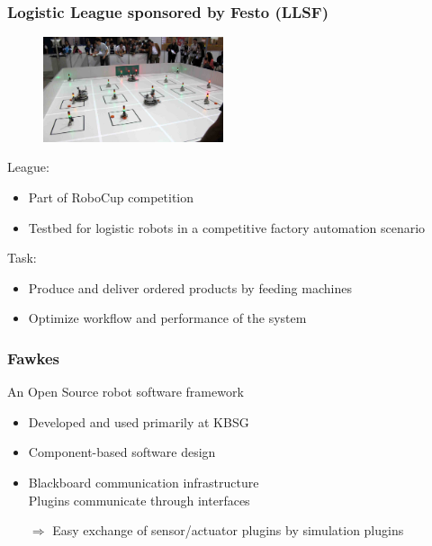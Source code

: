 \documentclass{beamer}
\begin{document}
\begin{frame}
\frametitle{Logistic League sponsored by Festo (LLSF)}
\fboxsep=0pt
\noindent%
\begin{minipage}[]{0.48\linewidth}
\begin{figure}
\includegraphics[width=150pt,heigth=120pt]{pics/llsfLeague.png}\\
\end{figure}
\end{minipage}%
\hfill%
\begin{minipage}[]{0.48\linewidth}
League:
\begin{itemize}
\item Part of RoboCup competition
\item Testbed for logistic robots in a competitive factory automation scenario
\end{itemize}
Task:
\begin{itemize}
\item Produce and deliver ordered products by feeding machines%
\item Optimize workflow and performance of the system
\end{itemize}
\end{minipage}
\end{frame}

\begin{frame}
\frametitle{Fawkes}
An Open Source robot software framework
\begin{itemize}
\item Developed and used primarily at KBSG
\item Component-based software design
\item Blackboard communication infrastructure\\ Plugins communicate through interfaces
\item[$\Rightarrow$] Easy exchange of sensor/actuator plugins by simulation plugins
\end{itemize}
\end{frame}
\end{document}
